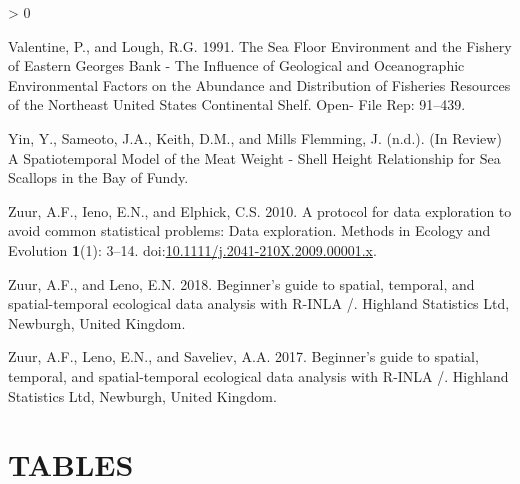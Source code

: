 \documentclass[
]{article}
\newlength{\cslhangindent}
\newenvironment{CSLReferences}[2] %
 {%
  \setlength{\parindent}{0pt}
  \ifodd #1 \everypar{\setlength{\hangindent}{\cslhangindent}}\ignorespaces\fi
  \ifnum #2 > 0
  \setlength{\parskip}{#2\baselineskip}
  \fi
 }%
 {}
\begin{document}
\begin{CSLReferences}{1}{0}
\leavevmode\hypertarget{ref-valentineSeaFloorEnvironment1991}{}%
Valentine, P., and Lough, R.G. 1991. The {Sea Floor Environment} and the {Fishery} of {Eastern Georges Bank} - {The Influence} of {Geological} and {Oceanographic Environmental Factors} on the {Abundance} and {Distribution} of {Fisheries Resources} of the {Northeast United States Continental Shelf}. Open- File Rep: 91--439.

\leavevmode\hypertarget{ref-yinPrepSpatiotemporalModel2019}{}%
Yin, Y., Sameoto, J.A., Keith, D.M., and Mills Flemming, J. (n.d.). ({In Review}) {A Spatiotemporal Model} of the {Meat Weight} - {Shell Height Relationship} for {Sea Scallops} in the {Bay} of {Fundy}.

\leavevmode\hypertarget{ref-zuurProtocolDataExploration2010}{}%
Zuur, A.F., Ieno, E.N., and Elphick, C.S. 2010. A protocol for data exploration to avoid common statistical problems: {Data} exploration. Methods in Ecology and Evolution \textbf{1}(1): 3--14. doi:\href{https://doi.org/10.1111/j.2041-210X.2009.00001.x}{10.1111/j.2041-210X.2009.00001.x}.

\leavevmode\hypertarget{ref-zuurBeginnerGuideSpatial2018}{}%
Zuur, A.F., and Leno, E.N. 2018. Beginner's guide to spatial, temporal, and spatial-temporal ecological data analysis with {R}-{INLA} /. {Highland Statistics Ltd}, {Newburgh, United Kingdom}.

\leavevmode\hypertarget{ref-zuurBeginnerGuideSpatial2017}{}%
Zuur, A.F., Leno, E.N., and Saveliev, A.A. 2017. Beginner's guide to spatial, temporal, and spatial-temporal ecological data analysis with {R}-{INLA} /. {Highland Statistics Ltd}, {Newburgh, United Kingdom}.

\end{CSLReferences}

\newpage

\clearpage

\hypertarget{ref-tabs}{%
\section{TABLES}\label{ref-tabs}}
\end{document}
